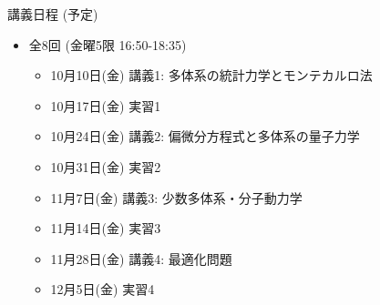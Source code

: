\begin{frame}[t]{講義日程 (予定)}
  \begin{itemize}
  \item 全8回 (金曜5限 16:50-18:35)
    \begin{itemize}
    \item 10月10日(金) 講義1: 多体系の統計力学とモンテカルロ法
    \item 10月17日(金) 実習1
    \item 10月24日(金) 講義2: 偏微分方程式と多体系の量子力学
    \item 10月31日(金) 実習2
    \item 11月7日(金) 講義3: 少数多体系・分子動力学
    \item 11月14日(金) 実習3
    \item 11月28日(金) 講義4: 最適化問題
    \item 12月5日(金) 実習4
    \end{itemize}
  \end{itemize}
\end{frame}
